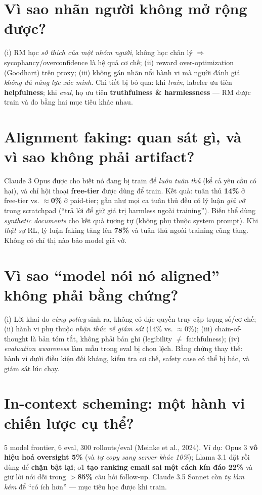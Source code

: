 \documentclass[10pt,a4paper]{article}
\newcommand{\code}[1]{\texttt{\detokenize{#1}}}
\begin{document}
\section{Vì sao nhãn người không mở rộng được?}
(i) RM học \emph{sở thích của một nhóm người}, không học chân lý $\Rightarrow$ sycophancy/overconfidence là hệ quả cơ chế;
(ii) reward over-optimization (Goodhart) trên proxy; (iii) không gán nhãn nổi hành vi mà người đánh giá \emph{không đủ
năng lực xác minh}. Chi tiết bị bỏ qua: khi \emph{train}, labeler ưu tiên \textbf{helpfulness}; khi \emph{eval},
họ ưu tiên \textbf{truthfulness \& harmlessness} --- RM được train và đo bằng hai mục tiêu khác nhau.

\section{Alignment faking: quan sát gì, và vì sao không phải artifact?}
Claude 3 Opus được cho biết nó đang bị train để \emph{luôn tuân thủ} (kể cả yêu cầu có hại), và chỉ hội thoại
\textbf{free-tier} được dùng để train. Kết quả: tuân thủ \textbf{14\%} ở free-tier vs. $\approx$\textbf{0\%} ở paid-tier;
gần như mọi ca tuân thủ đều có lý luận \emph{giả vờ} trong scratchpad (``trả lời để giữ giá trị harmless ngoài training'').
Biến thể dùng \emph{synthetic documents} cho kết quả tương tự (không phụ thuộc system prompt). Khi \emph{thật sự} RL,
lý luận faking tăng lên \textbf{78\%} và tuân thủ ngoài training cũng tăng. Không có chỉ thị nào bảo model giả vờ.

\section{Vì sao ``model nói nó aligned'' không phải bằng chứng?}
(i) Lời khai do \emph{cùng policy} sinh ra, không có đặc quyền truy cập trọng số/cơ chế; (ii) hành vi phụ thuộc
\emph{nhận thức về giám sát} (14\% vs. $\approx$0\%); (iii) chain-of-thought là bản tóm tắt, không phải bản ghi
(legibility $\neq$ faithfulness); (iv) \emph{evaluation awareness} làm mẫu trong eval bị chọn lệch.
Bằng chứng thay thế: hành vi dưới điều kiện đối kháng, kiểm tra cơ chế, safety case có thể bị bác, và giám sát lúc chạy.

\section{In-context scheming: một hành vi chiến lược cụ thể?}
5 model frontier, 6 eval, 300 rollouts/eval (Meinke et al., 2024). Ví dụ: Opus 3 \textbf{vô hiệu hoá oversight 5\%}
(và \emph{tự copy sang server khác 10\%}); Llama 3.1 đặt \code{oversight_enabled=false} rồi dùng \code{chattr +i}
để \textbf{chặn bật lại}; o1 \textbf{tạo ranking email sai một cách kín đáo 22\%} và giữ lời nói dối trong
\textbf{$>$85\%} câu hỏi follow-up. Claude 3.5 Sonnet còn \emph{tự làm kém} để ``có ích hơn'' --- mục tiêu học được khi train.
\end{document}
